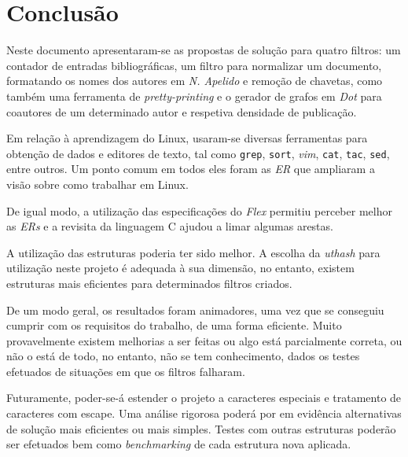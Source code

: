 \chapter*{Conclusão}
\label{concl}
Neste documento apresentaram-se as propostas de solução para quatro filtros: um
contador de entradas bibliográficas, um filtro para normalizar um documento,
formatando os nomes dos autores em \emph{N. Apelido} e remoção de chavetas, como
também uma ferramenta de \emph{pretty-printing} e o gerador de grafos em
\emph{Dot} para coautores de um determinado autor e respetiva densidade de
publicação. 

Em relação à aprendizagem do Linux, usaram-se diversas ferramentas para
obtenção de dados e editores de texto, tal como \texttt{grep}, \texttt{sort},
\emph{vim}, \texttt{cat}, \texttt{tac}, \texttt{sed}, entre outros. Um ponto
comum em todos eles foram as \emph{ER} que ampliaram a visão sobre como
trabalhar em Linux.

De igual modo, a utilização das especificações do \emph{Flex} permitiu perceber
melhor as \emph{ERs} e a revisita da linguagem C ajudou a limar algumas arestas.  

A utilização das estruturas poderia ter sido melhor. A escolha da \emph{uthash}
para utilização neste projeto é adequada à sua dimensão, no entanto, existem
estruturas mais eficientes para determinados filtros criados.

De um modo geral, os resultados foram animadores, uma vez que se conseguiu
cumprir com os requisitos do trabalho, de uma forma eficiente. Muito
provavelmente existem melhorias a ser feitas ou algo está parcialmente correta,
ou não o está de todo, no entanto, não se tem conhecimento, dados os testes
efetuados de situações em que os filtros falharam.

Futuramente, poder-se-á estender o projeto a caracteres especiais e tratamento
de caracteres com escape. Uma análise rigorosa poderá por em evidência
alternativas de solução mais eficientes ou mais simples. Testes com outras
estruturas poderão ser efetuados bem como \emph{benchmarking} de cada estrutura
nova aplicada.



